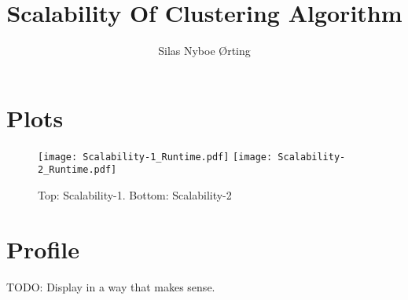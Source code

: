 \documentclass[a4paper]{article}
\begin{document}
\title{\vspace{-2.5cm}Scalability Of Clustering Algorithm}
\author{Silas Nyboe Ørting}
\maketitle
\thispagestyle{empty}



\pagebreak
\section{Plots}
\begin{figure}[!h]
  \centering
  \texttt{[image: Scalability-1\_Runtime.pdf]}
  \texttt{[image: Scalability-2\_Runtime.pdf]}
  \caption{Top: Scalability-1. Bottom: Scalability-2}
  \label{fig:scalability}
\end{figure}

\pagebreak
\section{Profile}
TODO: Display in a way that makes sense.
\end{document}
